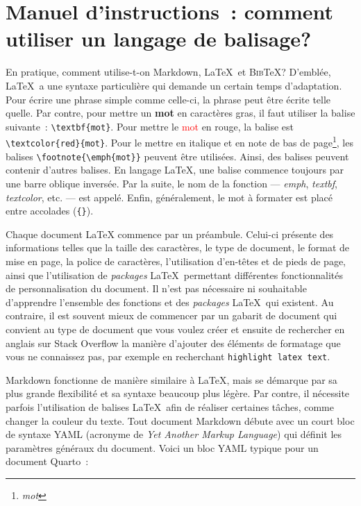 \documentclass[
  letterpaper,
  DIV=11,
  numbers=noendperiod]{scrreprt}
\begin{document}
\section{Manuel d'instructions~: comment utiliser un langage de
balisage?}\label{manuel-dinstructions-comment-utiliser-un-langage-de-balisage}

En pratique, comment utilise-t-on Markdown, \LaTeX~et \textsc{Bib}\TeX?
D'emblée, \LaTeX~a une syntaxe particulière qui demande un certain temps
d'adaptation. Pour écrire une phrase simple comme celle-ci, la phrase
peut être écrite telle quelle. Par contre, pour mettre un \textbf{mot}
en caractères gras, il faut utiliser la balise suivante~:
\texttt{\textbackslash{}textbf\{mot\}}. Pour mettre le
\textcolor{red}{mot} en rouge, la balise est
\texttt{\textbackslash{}textcolor\{red\}\{mot\}}. Pour le mettre en
italique et en note de bas de page\footnote{\emph{mot}}, les balises
\texttt{\textbackslash{}footnote\{\textbackslash{}emph\{mot\}\}} peuvent
être utilisées. Ainsi, des balises peuvent contenir d'autres balises. En
langage \LaTeX, une balise commence toujours par une barre oblique
inversée. Par la suite, le nom de la fonction --- \emph{emph},
\emph{textbf}, \emph{textcolor}, etc. --- est appelé. Enfin,
généralement, le mot à formater est placé entre accolades
(\texttt{\{\}}).

Chaque document \LaTeX{} commence par un préambule. Celui-ci présente
des informations telles que la taille des caractères, le type de
document, le format de mise en page, la police de caractères,
l'utilisation d'en-têtes et de pieds de page, ainsi que l'utilisation de
\emph{packages} \LaTeX~permettant différentes fonctionnalités de
personnalisation du document. Il n'est pas nécessaire ni souhaitable
d'apprendre l'ensemble des fonctions et des \emph{packages} \LaTeX~qui
existent. Au contraire, il est souvent mieux de commencer par un gabarit
de document qui convient au type de document que vous voulez créer et
ensuite de rechercher en anglais sur Stack Overflow la manière d'ajouter
des éléments de formatage que vous ne connaissez pas, par exemple en
recherchant \texttt{highlight\ latex\ text}.

Markdown fonctionne de manière similaire à \LaTeX, mais se démarque par
sa plus grande flexibilité et sa syntaxe beaucoup plus légère. Par
contre, il nécessite parfois l'utilisation de balises \LaTeX~afin de
réaliser certaines tâches, comme changer la couleur du texte. Tout
document Markdown débute avec un court bloc de syntaxe YAML (acronyme de
\emph{Yet Another Markup Language}) qui définit les paramètres généraux
du document. Voici un bloc YAML typique pour un document Quarto~:
\end{document}

